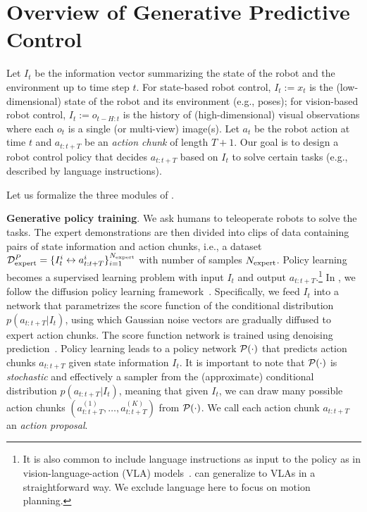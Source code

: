 
\section{Overview of Generative Predictive Control}
\label{sec:gpc}

Let $I_t$ be the information vector summarizing the state of the robot and the environment up to time step $t$. For state-based robot control, $I_t := x_t$ is the (low-dimensional) state of the robot and its environment (e.g., poses); for vision-based robot control, $I_t := o_{t-H:t}$ is the history of (high-dimensional) visual observations where each $o_t$ is a single (or multi-view) image(s). Let $a_t$ be the robot action at time $t$ and $a_{t:t+T}$ be an \emph{action chunk} of length $T+1$. Our goal is to design a robot control policy that decides $a_{t:t+T}$ based on $I_t$ to solve certain tasks (e.g., described by language instructions). 

Let us formalize the three modules of \nameshort.

\textbf{Generative policy training}. We ask humans to teleoperate robots to solve the tasks. The expert demonstrations are then divided into clips of data containing pairs of state information and action chunks, i.e., a dataset ${\cal D}_{\text{expert}}^P = \{ I_t^{i} \leftrightarrow a_{t:t+T}^{i} \}_{i=1}^{N_{\text{expert}}}$ with number of samples $N_{\text{expert}}$. Policy learning becomes a supervised learning problem with input $I_t$ and output $a_{t:t+T}$.\footnote{It is also common to include language instructions as input to the policy as in vision-language-action (VLA) models~\cite{kim2024openvla}. \nameshort can generalize to VLAs in a straightforward way. We exclude language here to focus on motion planning.} In \nameshort, we follow the diffusion policy learning framework~\cite{chi2023diffusion}. Specifically, we feed $I_t$ into a network that parametrizes the score function of the conditional distribution $p(a_{t:t+T} |I_t)$, using which Gaussian noise vectors are gradually diffused to expert action chunks. The score function network is trained using denoising prediction~\cite{ho2020denoising}. Policy learning leads to a policy network ${\cal P}(\cdot)$ that predicts action chunks $a_{t:t+T}$ given state information $I_t$. It is important to note that ${\cal P}(\cdot)$ is \emph{stochastic} and effectively a sampler from the (approximate) conditional distribution $p(a_{t:t+T} | I_t)$, meaning that given $I_t$, we can draw many possible action chunks $(a_{t:t+T}^{(1)},\dots, a_{t:t+T}^{(K)})$ from ${\cal P}(\cdot)$. We call each action chunk $a_{t:t+T}$ an \emph{action proposal}.

